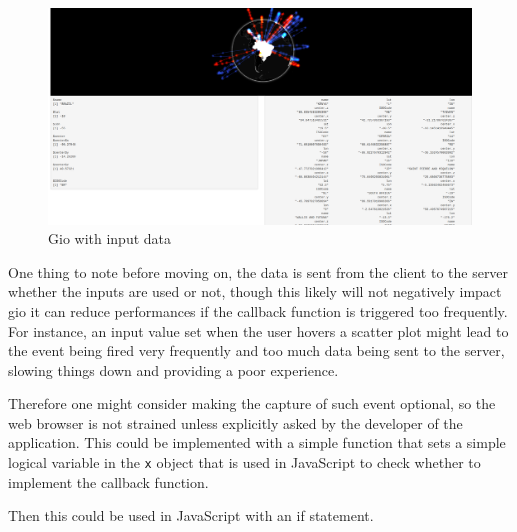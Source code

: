 \documentclass[
]{krantz}
\makeatletter
\newenvironment{Shaded}{\begin{snugshade}}{\end{snugshade}}
\newcommand{\CommentTok}[1]{\textcolor[rgb]{0.37,0.37,0.37}{\textit{#1}}}
\newcommand{\ControlFlowTok}[1]{\textcolor[rgb]{0.27,0.27,0.27}{\textbf{#1}}}
\newcommand{\KeywordTok}[1]{\textcolor[rgb]{0.27,0.27,0.27}{\textbf{#1}}}
\newcommand{\NormalTok}[1]{#1}
\newcommand{\OperatorTok}[1]{\textcolor[rgb]{0.43,0.43,0.43}{\textbf{#1}}}
\newcommand{\OtherTok}[1]{\textcolor[rgb]{0.37,0.37,0.37}{#1}}
\newcommand{\StringTok}[1]{\textcolor[rgb]{0.5,0.5,0.5}{#1}}
\newenvironment{kframe}{%
\medskip{}
\setlength{\fboxsep}{.8em}
 \def\at@end@of@kframe{}%
 \ifinner\ifhmode%
  \def\at@end@of@kframe{\end{minipage}}%
  \begin{minipage}{\columnwidth}%
 \fi\fi%
 \def\FrameCommand##1{\hskip\@totalleftmargin \hskip-\fboxsep
 \colorbox{shadecolor}{##1}\hskip-\fboxsep
     \hskip-\linewidth \hskip-\@totalleftmargin \hskip\columnwidth}%
 \MakeFramed {\advance\hsize-\width
   \@totalleftmargin\z@ \linewidth\hsize
   \@setminipage}}%
 {\par\unskip\endMakeFramed%
 \at@end@of@kframe}
\renewenvironment{Shaded}{\begin{kframe}}{\end{kframe}}
\makeatother
\begin{document}
\begin{figure}[t]

{\centering \includegraphics[width=1\linewidth]{images/gio-shiny-input-no-handler} 

}

\caption{Gio with input data}\label{fig:gio-shiny-no-handler}
\end{figure}

One thing to note before moving on, the data is sent from the client to the server whether the inputs are used or not, though this likely will not negatively impact gio it can reduce performances if the callback function is triggered too frequently. For instance, an input value set when the user hovers a scatter plot might lead to the event being fired very frequently and too much data being sent to the server, slowing things down and providing a poor experience.

Therefore one might consider making the capture of such event optional, so the web browser is not strained unless explicitly asked by the developer of the application. This could be implemented with a simple function that sets a simple logical variable in the \texttt{x} object that is used in JavaScript to check whether to implement the callback function.

\begin{Shaded}
\end{Shaded}

Then this could be used in JavaScript with an if statement.
\end{document}
